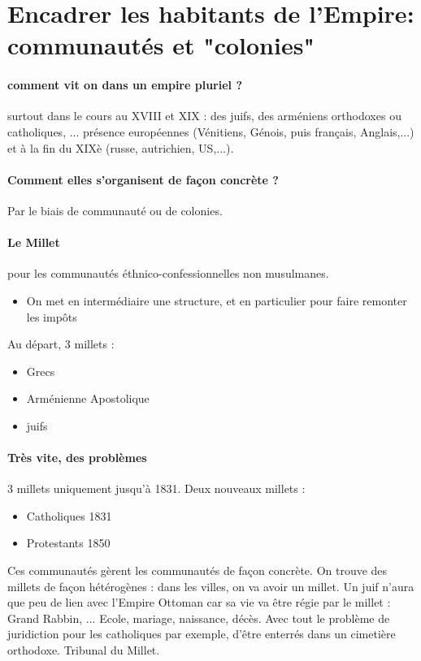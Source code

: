 \section{Encadrer les habitants de l'Empire: communautés et "colonies"}

\paragraph{comment vit on dans un empire pluriel ? } surtout dans le cours au XVIII et XIX : des juifs, des arméniens orthodoxes ou catholiques, ... présence européennes (Vénitiens, Génois, puis français, Anglais,...) et à la fin du XIXè (russe, autrichien, US,...). 

\paragraph{Comment elles s'organisent de façon concrète ? } 
Par le biais de communauté ou de colonies.

\paragraph{Le Millet} pour les communautés éthnico-confessionnelles non musulmanes. 
\begin{itemize}
    \item On met en intermédiaire une structure, et en particulier pour faire remonter les impôts
\end{itemize}

Au départ, 3 millets : 
\begin{itemize}
    \item Grecs
    \item Arménienne Apostolique
    \item juifs
\end{itemize}
\paragraph{Très vite, des problèmes} 3 millets uniquement jusqu'à 1831. Deux nouveaux millets : 
\begin{itemize}
    \item Catholiques 1831
    \item Protestants 1850
\end{itemize}
Ces communautés gèrent les communautés de façon concrète. 
On trouve des millets de façon hétérogènes : dans les villes, on va avoir un millet. 
Un juif n'aura que peu de lien avec l'Empire Ottoman car sa vie va être régie par le millet : Grand Rabbin, ... Ecole, mariage, naissance, décès. 
Avec tout le problème de juridiction pour les catholiques par exemple, d'être enterrés dans un cimetière orthodoxe.
Tribunal du Millet. 

